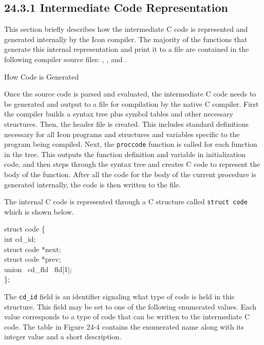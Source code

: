 \subsection[24.3.1 Intermediate Code Representation]{24.3.1 Intermediate Code Representation}

This section briefly describes how the intermediate C code is
represented and generated internally by the Icon compiler.  The
majority of the functions that generate this internal representation
and print it to a file are contained in the following compiler source
files: , , and .

{\sffamily
How Code is Generated}

Once the source code is parsed and evaluated, the intermediate C code
needs to be generated and output to a file for compilation by the
native C compiler. First the compiler builds a syntax tree plus symbol
tables and other necessary structures. Then, the header file is
created. This includes standard definitions necessary for all Icon
programs and structures and variables specific to the program being
compiled. Next, the \texttt{proccode} function is called for each
function in the tree. This outputs the function definition and
variable in initialization code, and then steps through the syntax
tree and creates C code to represent the body of the function. After
all the code for the body of the current procedure is generated
internally, the code is then written to the file.

The internal C code is represented through a C structure called
\texttt{struct code} which is shown below.

\goodbreak
\begin{iconcode}
struct code \{\\
\>int cd\_id;\\
\>struct code *next;\\
\>struct code *prev;\\
\>union \ cd\_fld \ fld[1];\\
\};\\
\end{iconcode}


The \texttt{cd\_id} field is an identifier signaling what type of code
is held in this structure. This field may be set to one of the
following enumerated values. Each value corresponds to a type of code
that can be written to the intermediate C code. The table in Figure
24-4 contains the enumerated name along with its integer value and a
short description.


